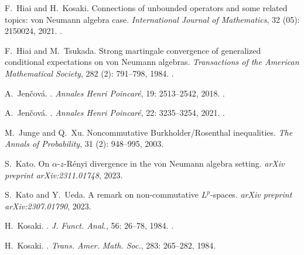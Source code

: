 \documentclass[12pt]{article}
\theoremstyle{definition}
\theoremstyle{remark}
\numberwithin{equation}{section}
\begin{document}
\begin{thebibliography}{27}
F.~Hiai and H.~Kosaki.
\newblock Connections of unbounded operators and some related topics: von
  {N}eumann algebra case.
\newblock \emph{International Journal of Mathematics}, 32
  (05): 2150024, 2021.
\newblock {}.

F.~Hiai and M.~Tsukada.
\newblock Strong martingale convergence of generalized conditional expectations
  on von {N}eumann algebras.
\newblock \emph{Transactions of the American Mathematical Society},
  282 (2): 791--798, 1984.
\newblock {}.

A.~Jen{\v c}ov{\'a}.
.
\newblock \emph{Annales Henri Poincar{\'e}}, 19: 2513--2542, 2018.
\newblock {}.

A.~Jen{\v{c}}ov{\'a}.
.
\newblock \emph{Annales Henri Poincar{\'e}}, 22: 3235–3254, 2021.
\newblock {}.

M.~Junge and Q.~Xu.
\newblock Noncommutative {B}urkholder/{R}osenthal inequalities.
\newblock \emph{The Annals of Probability}, 31 (2): 948--995,
  2003.

S.~Kato.
\newblock On $\alpha $-$ z $-{R}\'enyi divergence in the von {N}eumann algebra
  setting.
\newblock \emph{arXiv preprint arXiv:2311.01748}, 2023.

S.~Kato and Y.~Ueda.
\newblock A remark on non-commutative {$L^p$}-spaces.
\newblock \emph{arXiv preprint arXiv:2307.01790}, 2023.

H.~Kosaki.
.
\newblock \emph{{J. Funct. Anal.}}, {56}: {26--78},
  {1984}{}.
\newblock {}.

H.~Kosaki.
.
\newblock \emph{{Trans. Amer. Math. Soc.}}, {283}: {265--282},
  {1984}{}.


\end{thebibliography}
\end{document}
